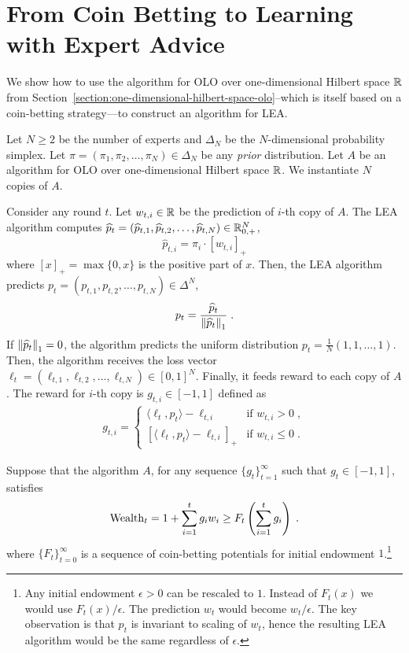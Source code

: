 \section{From Coin Betting to Learning with Expert Advice}
\label{section:reduction-experts}

We show how to use the algorithm for OLO over one-dimensional Hilbert space $\mathbb{R}$
from Section~\ref{section:one-dimensional-hilbert-space-olo}--which is itself
based on a coin-betting strategy---to construct an algorithm for \ac{LEA}.

Let $N \ge 2$ be the number of experts and $\Delta_N$ be the $N$-dimensional
probability simplex. Let $\pi = (\pi_1, \pi_2, \dots, \pi_N) \in \Delta_N$ be
any \emph{prior} distribution. Let $A$ be an algorithm for OLO over
one-dimensional Hilbert space $\mathbb{R}$. We instantiate $N$ copies of $A$.

Consider any round $t$. Let $w_{t,i} \in \mathbb{R}$ be the prediction of $i$-th copy of
$A$. The LEA algorithm computes $\widehat p_t = (\widehat p_{t,1}, \widehat
p_{t,2}, \dots, \widehat p_{t,N}) \in \mathbb{R}_{0,+}^N$,
$$
\widehat p_{t,i} = \pi_i \cdot [w_{t,i}]_+
$$
where $[x]_+ = \max\{0,x\}$ is the positive part of $x$. Then, the LEA
algorithm predicts $p_t = (p_{t,1}, p_{t,2}, \dots, p_{t,N}) \in \Delta^N$,
$$
p_t = \frac{\widehat p_t}{\left\|{\widehat p_t}\right\|_1} \; .
$$
If $\left\|{\widehat p_t}\right\|_1 = 0$, the algorithm predicts the uniform distribution
$p_t = \frac{1}{N}(1,1,\dots,1)$. Then, the algorithm receives the loss vector
$\ell_t = (\ell_{t,1}, \ell_{t,2}, \dots, \ell_{t,N}) \in [0,1]^N$. Finally, it
feeds reward to each copy of $A$. The reward for $i$-th copy is $g_{t,i} \in
[-1,1]$ defined as
\begin{align}
\label{eq:gradients_experts_reduction}
g_{t,i} =
\begin{cases}
\langle \ell_t, p_t \rangle - \ell_{t,i} & \text{if } w_{t,i} > 0 \; , \\
\left[\langle \ell_t, p_t \rangle - \ell_{t,i} \right]_+ & \text{if } w_{t,i} \le 0 \; .
\end{cases}
\end{align}

Suppose that the algorithm $A$, for any sequence
$\{g_t\}_{t=1}^\infty$ such that $g_t \in [-1,1]$, satisfies
\begin{equation}
\label{equation:experts-one-dimensional-assumption}
\operatorname{Wealth}_t = 1 + \sum_{i=1}^t g_i w_i \ge F_t\left(\sum_{i=1}^t g_i\right) \; .
\end{equation}
where $\{F_t\}_{t=0}^\infty$ is a sequence of coin-betting potentials for
initial endowment $1$.\footnote{Any initial endowment $\epsilon > 0$ can be
rescaled to $1$. Instead of $F_t(x)$ we would use $F_t(x)/\epsilon$. The
prediction $w_t$ would become $w_t/\epsilon$. The key observation is that $p_t$
is invariant to scaling of $w_t$, hence the resulting LEA algorithm would be the
same regardless of $\epsilon$.}

